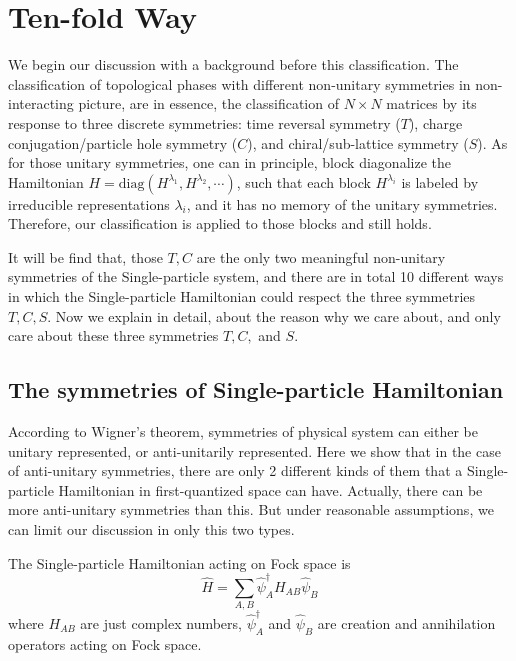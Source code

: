 \section{Ten-fold Way}

We begin our discussion with a background before this classification.  The
classification of topological phases with different non-unitary symmetries in
non-interacting picture, are in essence, the classification of $N\times N$
matrices by its response to three discrete symmetries: time reversal symmetry
($T$), charge conjugation/particle hole symmetry ($C$), and chiral/sub-lattice
symmetry ($S$). As for those unitary symmetries, one can in principle, block
diagonalize the Hamiltonian
$H=\mathrm{diag}(H^{\lambda_1},H^{\lambda_2},\cdots)$, such that each block
$H^{\lambda_i}$ is labeled by irreducible representations $\lambda_i$, and it
has no memory of the unitary symmetries. Therefore, our classification is
applied to those blocks and still holds.

It will be find that, those $T,C$ are the only two meaningful non-unitary
symmetries of the Single-particle system, and there are in total 10 different
ways in which the Single-particle Hamiltonian could respect the three symmetries
$T,C,S$. Now we explain in detail, about the reason why we care about, and only
care about these three symmetries $T,C,$ and $S$.

\subsection{The symmetries of Single-particle Hamiltonian}
\label{sec:The symmetries of Single-particle Hamiltonian}

According to Wigner's theorem, symmetries of physical system can either be
unitary represented, or anti-unitarily represented. Here we show that in the
case of anti-unitary symmetries, there are only 2 different kinds of them that a
Single-particle Hamiltonian in first-quantized space can have. Actually, there
can be more anti-unitary symmetries than this. But under reasonable assumptions,
we can limit our discussion in only this two types.

The Single-particle Hamiltonian acting on Fock space is
\begin{equation}
\label{eq:H-2nd}
\hat{H} = \sum_{A,B} \hat\psi^\dagger_A H_{AB} \hat\psi_{B}
\end{equation}
where $H_{AB}$ are just complex numbers, $\hat\psi^\dagger_A$ and $\hat\psi_B$
are creation and annihilation operators acting on Fock space.

